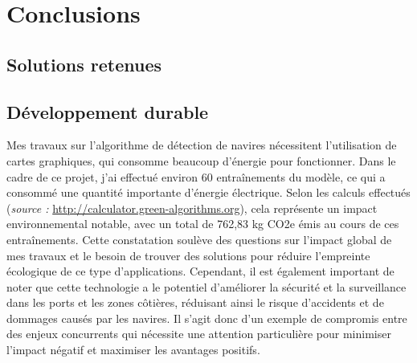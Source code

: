\chapter{Conclusions}

\section{Solutions retenues}

\section{Développement durable}

Mes travaux sur l'algorithme de détection    de navires nécessitent l'utilisation 
de cartes graphiques, qui consomme beaucoup d'énergie pour fonctionner. 
Dans le cadre de ce projet, j'ai effectué environ 60 entraînements du modèle, 
ce qui a consommé une quantité importante d'énergie électrique. 
Selon les calculs effectués (\textit{source : }\url{http://calculator.green-algorithms.org}), 
cela représente un impact environnemental notable, 
avec un total de 762,83 kg CO2e émis au cours de ces entraînements. 
Cette constatation soulève des questions sur l'impact global de mes travaux 
et le besoin de trouver des solutions pour réduire l'empreinte écologique de ce type d'applications. 
Cependant, il est également important de noter que cette technologie a le potentiel 
d'améliorer la sécurité et la surveillance dans les ports et les zones côtières, 
réduisant ainsi le risque d'accidents et de dommages causés par les navires. 
Il s'agit donc d'un exemple de compromis entre des enjeux concurrents qui 
nécessite une attention particulière pour minimiser l'impact négatif et maximiser les avantages positifs.